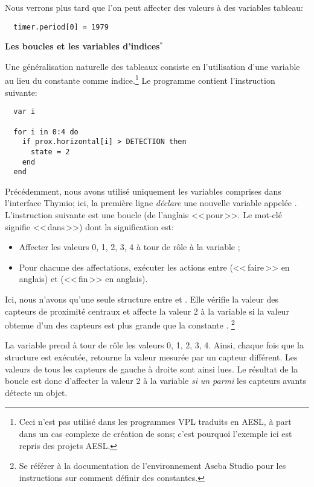 Nous verrons plus tard que l'on peut affecter des valeurs à des variables tableau:
\begin{footnotesize}
\begin{verbatim}
  timer.period[0] = 1979
\end{verbatim}
\end{footnotesize}

\textbf{\large Les boucles  et les variables d'indices$^*$}

Une généralisation naturelle des tableaux consiste en l'utilisation d'une variable au lieu du
constante comme indice.\footnote{Ceci n'est pas utilisé dans les programmes VPL traduits en AESL,
à part dans un cas complexe de création de sons; c'est pourquoi l'exemple ici est repris des projets
AESL.}
Le programme  contient l'instruction suivante:

\begin{footnotesize}
\begin{verbatim}
  var i

  for i in 0:4 do
    if prox.horizontal[i] > DETECTION then
      state = 2
    end
  end
\end{verbatim}
\end{footnotesize}

Précédemment, nous avons utilisé uniquement les variables comprises dans l'interface Thymio;
ici, la première ligne \emph{déclare} une nouvelle variable appelée .
L'instruction suivante est une boucle  (de l'anglais <<\,pour\,>>. Le mot-clé  signifie <<\,dans\,>>) dont la signification est: 

\begin{itemize}
\item Affecter les valeurs 0, 1, 2, 3, 4 à tour de rôle à la variable ;
\item Pour chacune des affectations, exécuter les actions entre  (<<\,faire\,>> en anglais)
    et  (<<\,fin\,>> en anglais).
\end{itemize}

Ici, nous n'avons qu'une seule structure  entre  et .
Elle vérifie la valeur des capteurs de proximité centraux et affecte la valeur 2 à la variable
 si la valeur obtenue d'un des capteurs est plus grande que la constante .
\footnote{Se référer à la documentation de l'environnement Aseba Studio pour les instructions
sur comment définir des constantes.}

La variable  prend à tour de rôle les valeurs 0, 1, 2, 3, 4.
Ainsi, chaque fois que la structure  est exécutée,  retourne
la valeur mesurée par un capteur différent. Les valeurs de tous les capteurs de gauche à droite
sont ainsi lues.
Le résultat de la boucle  est donc d'affecter la valeur 2 à la variable 
\emph{si} \emph{un parmi} les capteurs avants détecte un objet.

